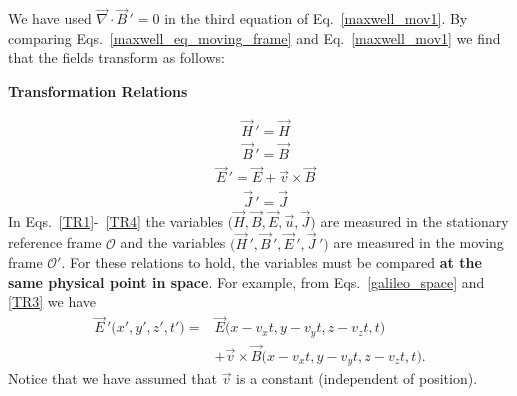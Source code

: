 \documentclass[11pt,a4paper,oneside]{book}
\numberwithin{equation}{section}
\theoremstyle{it}
\theoremstyle{definition}
\begin{document}
We have used $\vec{\nabla}\cdot\vec{B}\,'=0$ in the third equation of Eq.~\eqref{maxwell_mov1}. By comparing Eqs.~\eqref{maxwell_eq_moving_frame} and Eq.~\eqref{maxwell_mov1} we find that the fields transform as follows:
\bigskip \ \newline	\centerline{\textbf{Transformation Relations}}
\begin{equation}\label{TR1}
	\begin{aligned}
		&\vec{H}\,'=\vec{H}
	\end{aligned}
\end{equation} 
\begin{equation}\label{TR2}
	\begin{aligned}
		&\vec{B}\,'=\vec{B}
	\end{aligned}
\end{equation} 
\begin{equation}\label{TR3}
	\begin{aligned}
		&\vec{E}\,'=\vec{E}+\vec{v}\times\vec{B}
	\end{aligned}
\end{equation} 
\begin{equation}\label{TR4}
	\begin{aligned}
		&\vec{J}\,'=\vec{J}
	\end{aligned}
\end{equation} 
In Eqs.~\eqref{TR1}-~\ref{TR4} the variables $\big(\vec{H},\vec{B},\vec{E},\vec{u},\vec{J}\big)$ are measured in the stationary reference frame $\mathcal{O}$ and the variables $\big(\vec{H}\,',\vec{B}\,',\vec{E}\,',\vec{J}\,'\big)$ are measured in the moving frame $\mathcal{O}'$. For these relations to hold, the variables must be compared \textbf{at the same physical point in space}. For example, from Eqs.~\eqref{galileo_space} and \ref{TR3} we have
\begin{equation*}
	\begin{aligned}
		\vec{E}\,'\big(x',y',z',t'\big)= & \vec{E}\big(x-v_xt,y-v_yt,z-v_zt,t\big) \\[8pt]
		&+ \vec{v}\times\vec{B}\big(x-v_xt,y-v_yt,z-v_zt,t\big).
	\end{aligned}
\end{equation*} 
Notice that we have assumed that $\vec{v}$ is a constant (independent of position). 
\end{document}
